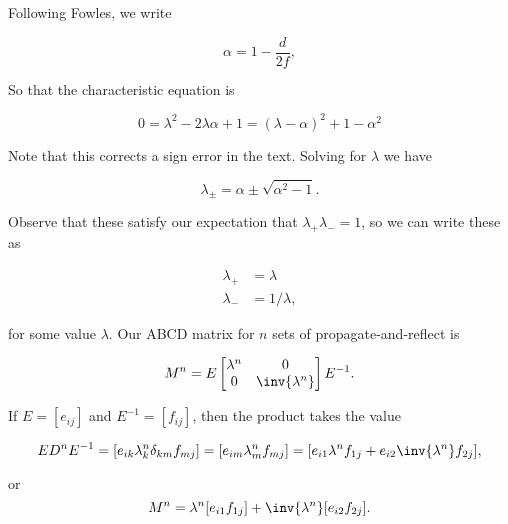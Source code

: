 {Following Fowles, we write

\begin{dmath}\label{eqn:problemSet4Problem4:120}
\alpha = 1 - \frac{d}{2 f},
\end{dmath}

So that the characteristic equation is

\begin{dmath}\label{eqn:problemSet4Problem4:140}
0
= 
\lambda^2 - 2 \lambda \alpha + 1
= 
\left( \lambda - \alpha \right)^2 + 1 - \alpha^2
\end{dmath}

Note that this corrects a sign error in the text.  Solving for $\lambda$ we have

\begin{dmath}\label{eqn:problemSet4Problem4:160}
\lambda_{\pm} = \alpha \pm \sqrt{\alpha^2 - 1}.
\end{dmath}

Observe that these satisfy our expectation that $\lambda_{+} \lambda_{-} = 1$, so we can write these as 

\begin{align}\label{eqn:problemSet4Problem4:300}
\lambda_{+} &= \lambda \\
\lambda_{-} &= 1/\lambda,
\end{align}

for some value $\lambda$.  Our ABCD matrix for $n$ sets of propagate-and-reflect is

\begin{dmath}\label{eqn:problemSet4Problem4:260}
M^n = E 
\begin{bmatrix}
\lambda^n & 0 \\
0 & \inv{\lambda^n}
\end{bmatrix}
E^{-1}.
\end{dmath}

If $E = [ e_{i j} ]$ and $E^{-1} = [ f_{i j} ]$, then the product takes the value

\begin{dmath}\label{eqn:problemSet4Problem4:280}
E D^n E^{-1} 
= [ e_{i k} \lambda_k^n \delta_{k m } f_{m j} ]
= [ e_{i m} \lambda_m^n f_{m j} ]
= [ 
e_{i 1} \lambda^n f_{1 j} 
+
e_{i 2} \inv{\lambda^n} f_{2 j} 
],
\end{dmath}

or
\begin{dmath}\label{eqn:problemSet4Problem4:320}
M^n
= 
\lambda^n [ e_{i 1} f_{1 j} ] + \inv{\lambda^n} [ e_{i 2} f_{2 j} ].
\end{dmath}

}

